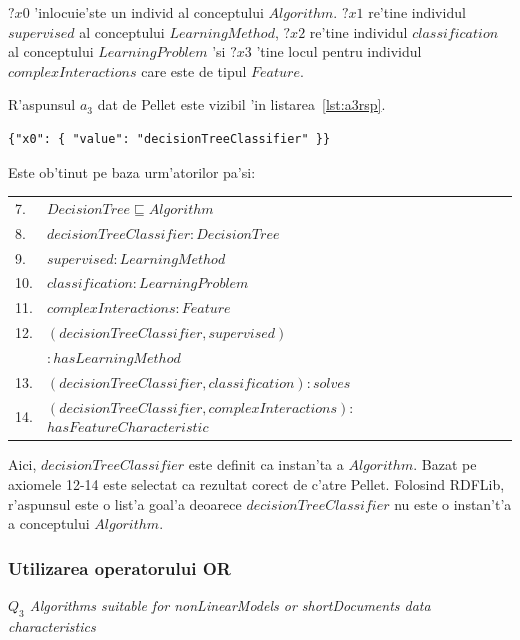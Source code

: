 \documentclass[12pt,a4paper,twoside]{report}
\begin{document}
$?x0$ 'inlocuie'ste un individ al conceptului $Algorithm$. $?x1$ re'tine individul $supervised$ al conceptului $LearningMethod$, $?x2$ re'tine individul $classification$ al conceptului $LearningProblem$ 'si $?x3$ 'tine locul pentru individul $complexInteractions$ care este de tipul $Feature$.

R'aspunsul $a_3$ dat de Pellet este vizibil 'in listarea~\ref{lst:a3rsp}.
\newline
\begin{lstlisting}[basicstyle=\footnotesize, caption=R'aspunsul $a_3$ la 'intrebarea $Q_2$, label=lst:a3rsp]
{"x0": { "value": "decisionTreeClassifier" }}
\end{lstlisting}

Este ob'tinut pe baza urm'atorilor pa'si:

\vspace*{0.3cm}
\begin{small}
\begin{tabular}{ll}
7. & $DecisionTree  \sqsubseteq Algorithm$\\
8. & $decisionTreeClassifier:DecisionTree$\\
9. & $supervised: LearningMethod$\\
10. & $classification: LearningProblem$\\
11. & $complexInteractions: Feature$\\
12. & $(decisionTreeClassifier,supervised)$\\
    & $     : hasLearningMethod$\\
13. & $(decisionTreeClassifier,classification): solves$\\
14. & $(decisionTreeClassifier,complexInteractions)$: $hasFeatureCharacteristic$\\
\end{tabular}
\end{small}
\vspace*{0.3cm}

Aici, $decisionTreeClassifier$ este definit ca instan'ta a $Algorithm$. Bazat pe axiomele 12-14 este selectat ca rezultat corect de c'atre Pellet. Folosind RDFLib, r'aspunsul este o list'a goal'a deoarece  $decisionTreeClassifier$ nu este o instan't'a a conceptului $Algorithm$.

\subsubsection{Utilizarea operatorului OR}
{\it $Q_3$ Algorithms suitable for nonLinearModels or shortDocuments data characteristics}
\end{document}
